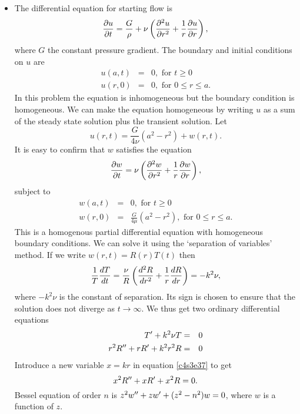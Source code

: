 \begin{itemize}
\item The differential equation for starting flow is
\begin{equation}\label{c4s3e29}
\frac{\partial{u}}{\partial{t}} = \frac{G}{\rho} + \nu\left(\frac{\partial^2 u}{\partial r^2} + \frac{1}{r}\frac{\partial{u}}{\partial{r}}\right),
\end{equation}
where $G$ the constant pressure gradient. The boundary and initial conditions on $u$ are
\begin{eqnarray}
u(a, t) &=& 0, \text{ for } t \ge 0 \label{c4s3e30} \\
u(r, 0) &=& 0, \text{ for } 0 \le r \le a.\label{c4s3e31}
\end{eqnarray}
In this problem the equation is inhomogeneous but the boundary condition is homogeneous. We can make the
equation homogeneous by writing $u$ as a sum of the steady state solution plus the transient solution. Let
\begin{equation}\label{c4s3e32}
u(r, t) = \frac{G}{4\nu}(a^2 - r^2) + w(r, t).
\end{equation}
It is easy to confirm that $w$ satisfies the equation
\begin{equation}\label{c4s3e33}
\frac{\partial{w}}{\partial{t}} = \nu\left(\frac{\partial^2 w}{\partial r^2} + \frac{1}{r}\frac{\partial{w}}{\partial{r}}\right),
\end{equation}
subject to
\begin{eqnarray}
w(a, t) &=& 0, \text{ for } t \ge 0 \label{c4s3e34} \\
w(r, 0) &=& \frac{G}{4\mu}(a^2 - r^2), \text{ for } 0 \le r \le a.\label{c4s3e35}
\end{eqnarray}
This is a homogenous partial differential equation with homogeneous boundary conditions. We can solve it
using the `separation of variables' method. If we write $w(r, t) = R(r)T(t)$ then
\[
\frac{1}{T}\frac{d{T}}{d{t}} = \frac{\nu}{R}\left(\frac{d^2R}{dr^2} + \frac{1}{r}\frac{d{R}}{d{r}}\right) = -k^2\nu,
\]
where $-k^2\nu$ is the constant of separation. Its sign is chosen to ensure that the solution does not
diverge as $t \rightarrow \infty$. We thus get two ordinary differential equations
\begin{eqnarray}
T^\prime + k^2\nu T &=& 0 \label{c4s3e36} \\
r^2R^{\prime\prime} + rR^\prime + k^2r^2R &=& 0 \label{c4s3e37}
\end{eqnarray}
Introduce a new variable $x = kr$ in equation \eqref{c4s3e37} to get
\begin{equation}\label{c4s3e38}
x^2R^{\prime\prime} + xR^\prime + x^2R = 0.
\end{equation}
Bessel equation of order $n$ is $z^2w^{\prime\prime} + zw^\prime + (z^2 - n^2)w = 0$, where $w$ is a function of $z$. 

\end{itemize}
